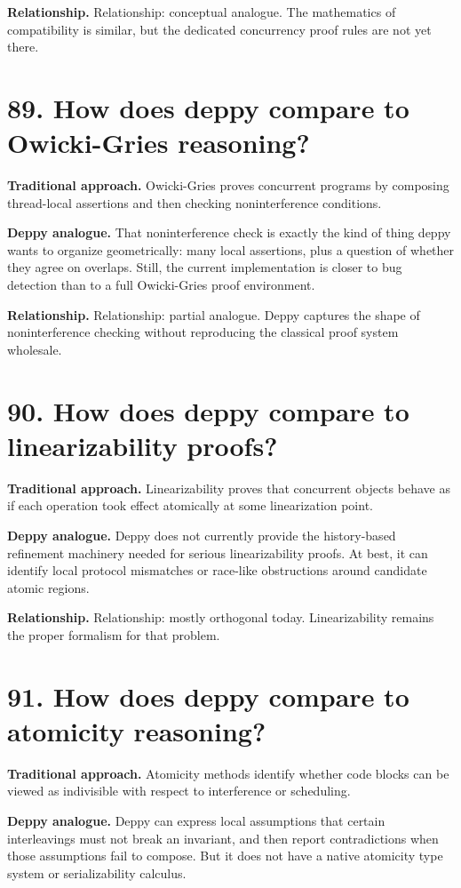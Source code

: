 \documentclass[11pt,openany]{book}
\begin{document}
\textbf{Relationship.} Relationship: conceptual analogue. The mathematics of compatibility is similar, but the dedicated concurrency proof rules are not yet there.

\section*{89. How does deppy compare to Owicki-Gries reasoning?}
\textbf{Traditional approach.} Owicki-Gries proves concurrent programs by composing thread-local assertions and then checking noninterference conditions.

\textbf{Deppy analogue.} That noninterference check is exactly the kind of thing deppy wants to organize geometrically: many local assertions, plus a question of whether they agree on overlaps. Still, the current implementation is closer to bug detection than to a full Owicki-Gries proof environment.

\textbf{Relationship.} Relationship: partial analogue. Deppy captures the shape of noninterference checking without reproducing the classical proof system wholesale.

\section*{90. How does deppy compare to linearizability proofs?}
\textbf{Traditional approach.} Linearizability proves that concurrent objects behave as if each operation took effect atomically at some linearization point.

\textbf{Deppy analogue.} Deppy does not currently provide the history-based refinement machinery needed for serious linearizability proofs. At best, it can identify local protocol mismatches or race-like obstructions around candidate atomic regions.

\textbf{Relationship.} Relationship: mostly orthogonal today. Linearizability remains the proper formalism for that problem.

\section*{91. How does deppy compare to atomicity reasoning?}
\textbf{Traditional approach.} Atomicity methods identify whether code blocks can be viewed as indivisible with respect to interference or scheduling.

\textbf{Deppy analogue.} Deppy can express local assumptions that certain interleavings must not break an invariant, and then report contradictions when those assumptions fail to compose. But it does not have a native atomicity type system or serializability calculus.
\end{document}
